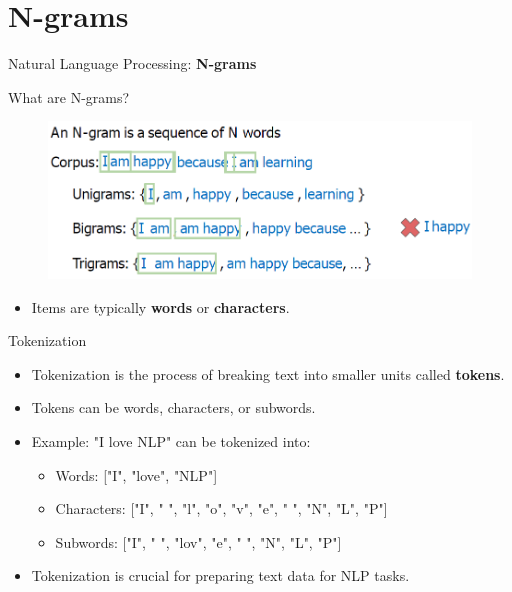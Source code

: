 \section{N-grams}
\begin{frame}{}
    \LARGE Natural Language Processing: \textbf{N-grams}
\end{frame}

\begin{frame}{What are N-grams?}
    \begin{figure}
        \centering
        \includegraphics[width=\textwidth,height=0.8\textheight,keepaspectratio]{images/nlp-intro/ngram.png}
    \end{figure}
    \vspace{1em}
    \begin{itemize} 
        \item Items are typically \textbf{words} or \textbf{characters}.
    \end{itemize}
\end{frame}

\begin{frame}{Tokenization}
    \begin{itemize}
        \item Tokenization is the process of breaking text into smaller units called \textbf{tokens}.
        \item Tokens can be words, characters, or subwords.
        \item Example: "I love NLP" can be tokenized into:
        \begin{itemize}
            \item Words: ["I", "love", "NLP"]
            \item Characters: ["I", " ", "l", "o", "v", "e", " ", "N", "L", "P"]
            \item Subwords: ["I", " ", "lov", "e", " ", "N", "L", "P"]
        \end{itemize}
        \item Tokenization is crucial for preparing text data for NLP tasks.
    \end{itemize}
\end{frame}

